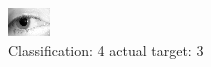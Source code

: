 \begin{figure}[h!]
\begin{center}
\includegraphics[width=0.60\columnwidth]{figures/ID1271_class_4_target_3.png}
\end{center}
\caption{ Classification: 4 actual target: 3}
\label{fig:ID1271_class_4_target_3}
\end{figure}
